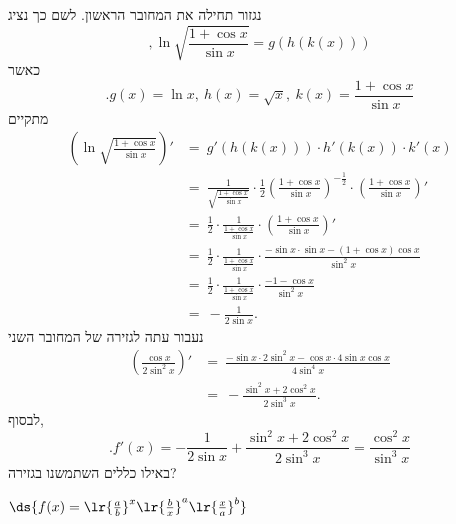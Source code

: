 \begin{solbox}
נגזור תחילה את המחובר הראשון. לשם כך נציג
$$,\ln\sqrt{\frac{1 + \cos x}{\sin x}}=g(h(k(x)))$$
כאשר
$$.g(x)=\ln x,\ h(x)=\sqrt{x},\ k(x)=\frac{1 + \cos x}{\sin x}$$
מתקיים
\begin{align*}
    \left(\ln\sqrt{\frac{1 + \cos x}{\sin x}}\right)'&=\ g'(h(k(x)))\cdot h'(k(x))\cdot k'(x)\\
    &=\ \frac{1}{\sqrt{\frac{1 + \cos x}{\sin x}}}\cdot\frac{1}{2}\left(\frac{1 + \cos x}{\sin x}\right)^{-\frac{1}{2}}\cdot\left(\frac{1 + \cos x}{\sin x}\right)'\\
    &=\ \frac{1}{2}\cdot\frac{1}{\frac{1 + \cos x}{\sin x}}\cdot\left(\frac{1 + \cos x}{\sin x}\right)'\\
    &=\ \frac{1}{2}\cdot\frac{1}{\frac{1 + \cos x}{\sin x}}\cdot\frac{-\sin x\cdot\sin x-(1+\cos x)\cos x}{\sin^2x}\\
    &=\ \frac{1}{2}\cdot\frac{1}{\frac{1 + \cos x}{\sin x}}\cdot\frac{-1-\cos x}{\sin^2x}\\
    &=\ -\frac{1}{2\sin x}.
\end{align*}
נעבור עתה לגזירה של המחובר השני
\begin{align*}
    \left(\frac{\cos x}{2 \sin^2 x}\right)'&=\ \frac{-\sin x\cdot2\sin^2x-\cos x\cdot4\sin x\cos x}{4\sin^4x}\\
    &=\ -\frac{\sin^2x+2\cos^2x}{2\sin^3x}.
\end{align*}
לבסוף,
$$.f'(x)=-\frac{1}{2\sin x}+\frac{\sin^2x+2\cos^2x}{2\sin^3x}=\frac{\cos^2x}{\sin^3x}$$
באילו כללים השתמשנו בגזירה?
\end{solbox}
\item $\ds{f(x) = \lr{\frac{a}{b}}^x\lr{\frac{b}{x}}^a\lr{\frac{x}{a}}^b}$

